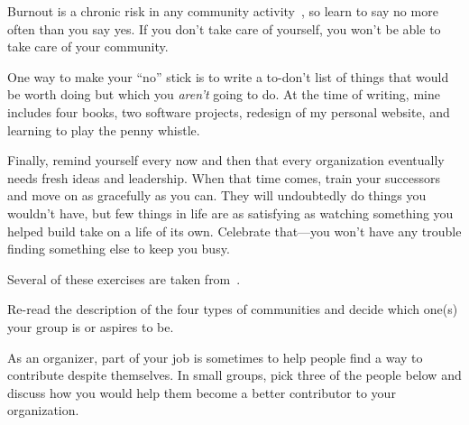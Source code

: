 
Burnout is a chronic risk in any community activity~\cite{Pign2016},
so learn to say no more often than you say yes.
If you don't take care of yourself,
you won't be able to take care of your community.

One way to make your ``no'' stick
is to write a to-don't list of things that would be worth doing
but which you \emph{aren't} going to do.
At the time of writing,
mine includes four books,
two software projects,
redesign of my personal website,
and learning to play the penny whistle.

Finally,
remind yourself every now and then that
every organization eventually needs fresh ideas and leadership.
When that time comes,
train your successors and move on as gracefully as you can.
They will undoubtedly do things you wouldn't have,
but few things in life are as satisfying as
watching something you helped build take on a life of its own.
Celebrate that---you won't have any trouble finding something else to keep you busy.


Several of these exercises are taken from~\cite{Brow2007}.


Re-read the description of the four types of communities
and decide which one(s) your group is or aspires to be.


As an organizer,
part of your job is sometimes to help people find a way to contribute despite themselves.
In small groups,
pick three of the people below
and discuss how you would help them become a better contributor to your organization.

